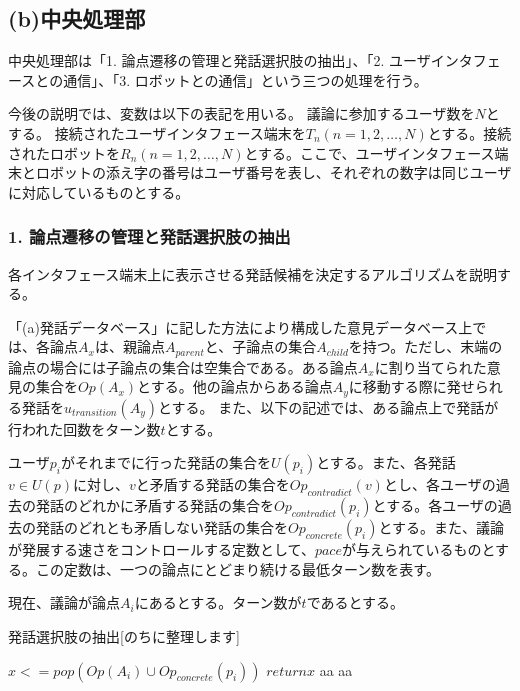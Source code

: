\documentclass[11pt, a4paper]{jreport} %
\begin{document}
\subsection*{(b)中央処理部}
中央処理部は「1. 論点遷移の管理と発話選択肢の抽出」、「2. ユーザインタフェースとの通信」、「3. ロボットとの通信」という三つの処理を行う。



今後の説明では、変数は以下の表記を用いる。
議論に参加するユーザ数を$N$とする。
接続されたユーザインタフェース端末を$T_n (n = 1, 2, \dots, N)$とする。接続されたロボットを$R_n (n = 1, 2, \dots, N)$とする。ここで、ユーザインタフェース端末とロボットの添え字の番号はユーザ番号を表し、それぞれの数字は同じユーザに対応しているものとする。


\subsubsection{1. 論点遷移の管理と発話選択肢の抽出}
各インタフェース端末上に表示させる発話候補を決定するアルゴリズムを説明する。

「(a)発話データベース」に記した方法により構成した意見データベース上では、各論点$A_x$は、親論点$A_{parent}$と、子論点の集合$A_{child}$を持つ。ただし、末端の論点の場合には子論点の集合は空集合である。ある論点$A_x$に割り当てられた意見の集合を$Op(A_x)$とする。他の論点からある論点$A_y$に移動する際に発せられる発話を$u_{transition}(A_y)$とする。
また、以下の記述では、ある論点上で発話が行われた回数をターン数$t$とする。


ユーザ$p_i$がそれまでに行った発話の集合を$U(p_i)$とする。また、各発話$v \in U(p)$に対し、$v$と矛盾する発話の集合を$Op_{contradict}(v)$とし、各ユーザの過去の発話のどれかに矛盾する発話の集合を$Op_{contradict}(p_i)$とする。各ユーザの過去の発話のどれとも矛盾しない発話の集合を$Op_{concrete}(p_i)$とする。また、議論が発展する速さをコントロールする定数として、$pace$が与えられているものとする。この定数は、一つの論点にとどまり続ける最低ターン数を表す。


現在、議論が論点$A_i$にあるとする。ターン数が$t$であるとする。
\begin{algorithm}
\caption{発話選択肢の抽出[のちに整理します]}
\begin{algorithmic}[1]
 \STATE $x <= pop(Op(A_i) \cup Op_{concrete}(p_i))$
 \STATE $return x$
 \STATE aa
 \ENDIF
\ELSE
 \STATE aa
\ENDIF

\end{algorithmic} 
\end{algorithm}
\end{document}
